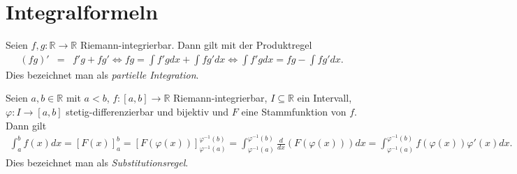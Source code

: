 \documentclass{book}
\begin{document}
\section{Integralformeln}
\label{sec:integralformeln}

Seien $f, g:\mathbb{R}\to\mathbb{R}$ Riemann-integrierbar. Dann gilt mit der Produktregel
%
\begin{eqnarray}
\left(fg\right)' & = & f'g + fg'\Leftrightarrow fg = \int f'gdx + \int fg'dx\Leftrightarrow \int f'gdx = fg - \int fg'dx.
\end{eqnarray}
%
Dies bezeichnet man als \textit{partielle Integration}.

Seien $a, b\in\mathbb{R}$ mit $a<b$, $f:\left[a, b\right]\to\mathbb{R}$ Riemann-integrierbar, $I\subseteq\mathbb{R}$ ein Intervall, $\varphi:I\to\left[a, b\right]$ stetig-differenzierbar und bijektiv und $F$ eine Stammfunktion von $f$. Dann gilt
%
\begin{eqnarray}
\int_{a}^{b}f\left(x\right)dx = \left[F\left(x\right)\right]_a^b = \left[F\left(\varphi\left(x\right)\right)\right]_{\varphi^{-1}\left(a\right)}^{\varphi^{-1}\left(b\right)} = \int_{\varphi^{-1}\left(a\right)}^{\varphi^{-1}\left(b\right)}\frac{d}{dx}\left(F\left(\varphi\left(x\right)\right)\right)dx = \int_{\varphi^{-1}\left(a\right)}^{\varphi^{-1}\left(b\right)}f\left(\varphi\left(x\right)\right)\varphi'\left(x\right)dx.
\end{eqnarray}
%
Dies bezeichnet man als \textit{Substitutionsregel}.
\end{document}

